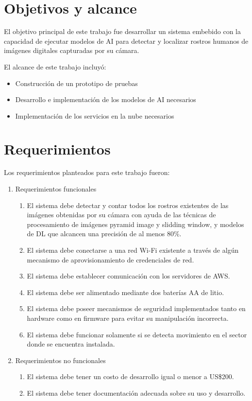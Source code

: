 \section{Objetivos y alcance}
El objetivo principal de este trabajo fue desarrollar un sistema embebido con la capacidad de ejecutar modelos de AI para detectar y localizar rostros humanos de imágenes digitales capturadas por su cámara.

El alcance de este trabajo incluyó:
\begin{itemize}
	\item Construcción de un prototipo de pruebas
	\item Desarrollo e implementación de los modelos de AI necesarios
	\item Implementación de los servicios en la nube necesarios
\end{itemize}
\section{Requerimientos}
Los requerimientos planteados para este trabajo fueron:
\begin{enumerate}
	\item Requerimientos funcionales
   \begin{enumerate}
      	\item El sistema debe detectar y contar todos los rostros existentes de las imágenes obtenidas por su cámara con ayuda de las técnicas de procesamiento de imágenes pyramid image y slidding window, y modelos de DL que alcancen una precisión de al menos 80\%.
		\item El sistema debe conectarse a una red Wi-Fi existente a través de algún mecanismo de aprovisionamiento de credenciales de red.
		\item El sistema debe establecer comunicación con los servidores de AWS.
		\item El sistema debe ser alimentado mediante dos baterías AA de litio.
		\item El sistema debe poseer mecanismos de seguridad implementados tanto en hardware como en firmware para evitar su manipulación incorrecta.
		\item El sistema debe funcionar solamente si se detecta movimiento en el sector donde se encuentra instalada.
	\end{enumerate}
	\item Requerimientos no funcionales
	\begin{enumerate}
		\item El sistema debe tener un costo de desarrollo igual o menor a US\$200.
		\item El sistema debe tener documentación adecuada sobre su uso y desarrollo.
	\end{enumerate}
\end{enumerate}





